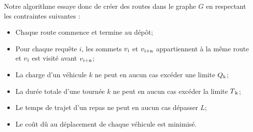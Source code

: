\documentclass[10pt,a4paper]{report}
\begin{document}
Notre algorithme essaye donc de créer des routes dans le graphe $G$ en respectant les contraintes suivantes :
\begin{itemize}
\item Chaque route commence et termine au dépôt;
\item Pour chaque requête $i$, les sommets $v\textsubscript{i}$ et $v\textsubscript{i+n}$ appartiennent à la même route et $v\textsubscript{i}$ est visité avant $v\textsubscript{i+n}$;
\item La charge d'un véhicule $k$ ne peut en aucun cas excéder une limite $Q\textsubscript{k}$;
\item La durée totale d'une tournée $k$ ne peut en aucun cas excéder la limite $T\textsubscript{k}$;
\item Le temps de trajet d'un repas ne peut en aucun cas dépasser $L$;
\item Le coût dû au déplacement de chaque véhicule est minimisé. 
\end{itemize}


\end{document}

